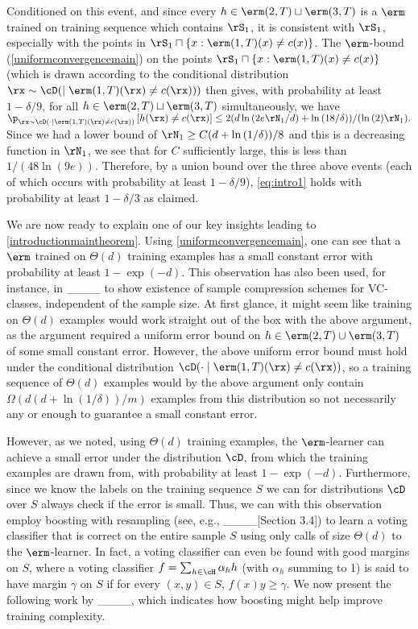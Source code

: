 Conditioned on this event, and since every $h\in \erm(2,T)\sqcup\erm(3,T)$ is a $ \erm $ trained on training sequence which contains $\rS_{1}$, it is consistent with $ \rS_{1}$, especially with the points in $\rS_{1}\sqcap \{x: \erm(1,T)(x)\not=c(x) \}$. The $ \erm $-bound (\cref{uniformconvergencemain}) on the points $\rS_{1}\sqcap \{x: \erm(1,T)(x)\not=c(x) \}$ (which is drawn according to the conditional distribution $\rx\sim\cD(\mid \erm(1,T)(\rx)\not=c(\rx)))
$ then gives, with probability at least $1-\delta/9$, for all $h\in \erm(2,T)\sqcup\erm(3,T)$ simultaneously, we have
$\p_{\rx\sim\cD(\cdot \mid \erm(1,T)(\rx)\not=c(\rx))}\left[h(\rx)\not=c(\rx)\right]\leq 2(d\ln{\left(2e \rN_{1}/d \right)}+\ln{\left(18/\delta \right)})/(\ln{\left(2 \right)}\rN_{1}).$ Since we had a lower bound of $\rN_{1}\geq C(d+ \ln{\left(1/\delta \right)} )/8$ and this is a decreasing function in $\rN_{1}$, we see that for $C$ sufficiently large, this is less than $1/(48\ln{\left(9e \right)})$. Therefore, by a union bound over the three above events (each of which occurs with probability at least $1-\delta/9$), \cref{eq:intro1} holds with probability at least $1-\delta/3$ as claimed. 

We are now ready to explain one of our key insights leading to \cref{introductionmaintheorem}. Using \cref{uniformconvergencemain}, one can see that a $ \erm $ trained on $ \Theta(d) $ training examples has a small constant error with probability at least $ 1-\exp(-d) $. This observation has also been used, for instance, in ____ to show existence of sample compression schemes for VC-classes, independent of the sample size. At first glance, it might seem like training on $ \Theta(d) $ examples would work straight out of the box with the above argument, as the argument required a uniform error bound on $h\in \erm(2,T)\cup \erm(3,T) $ of some small constant error. However, the above uniform error bound must hold under the conditional distribution $ \cD(\cdot \mid \erm(1,T)(\rx)\not=c(\rx))$, so a training sequence of $\Theta(d) $ examples would by the above argument only contain $ \Omega(d(d+\ln{\left(1/\delta \right)})/m) $ examples from this distribution so not necessarily any or enough to guarantee a small constant error. 

However, as we noted, using $ \Theta(d) $ training examples, the $ \erm $-learner can achieve a small error under the distribution $ \cD $, from which the training examples are drawn from, with probability at least $ 1- \exp{\left(-d \right)}  $. Furthermore, since we know the labels on the training sequence $ S $ we can for distributions $\cD$ over $S$ always check if the error is small. Thus, we can with this observation employ boosting with resampling (see, e.g., ____[Section 3.4]) to learn a voting classifier that is correct on the entire sample $ S $  using only calls of size $ \Theta(d) $ to the $ \erm $-learner. In fact, a voting classifier can even be found with good margins on $ S $, where a voting classifier $ f =\sum_{h\in\cH}\alpha_{h}h$ (with $ \alpha_{h} $ summing to 1) is said to have margin $ \gamma $ on $ S $ if for every $ (x,y)\in S $,  $f(x)y\geq \gamma  $. We now present the following work by ____, which indicates how boosting might help improve training complexity.
\vspace{-0.3cm}
